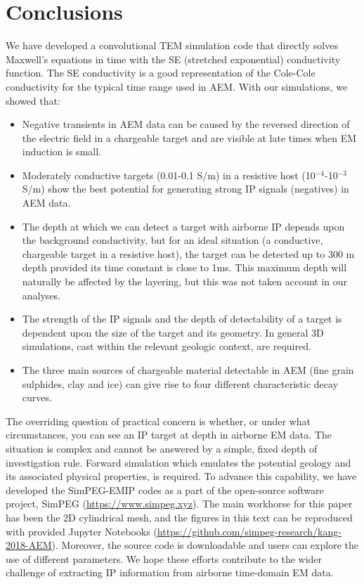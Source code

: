 \documentclass[manuscript]{geophysics}
\begin{document}
\section{Conclusions}
We have developed a convolutional TEM simulation code that directly solves Maxwell's equations in time with the SE (stretched exponential) conductivity function. The SE conductivity is a good representation of the Cole-Cole conductivity for the typical time range used in AEM. With our simulations, we showed that:
\begin{itemize}
    \item Negative transients in AEM data can be caused by the reversed direction of the electric field in a chargeable target and are visible at late times when EM induction is small.
    \item Moderately conductive targets (0.01-0.1 S/m) in a resistive host (10$^{-4}$-10$^{-3}$ S/m) show the best potential for generating strong IP signals (negatives) in AEM data.
    \item The depth at which we can detect a target with airborne IP depends upon the background conductivity, but for an ideal situation (a conductive, chargeable target in a resistive host), the target can be detected up to 300 m depth provided its time constant is close to 1ms. This maximum depth will naturally be affected by the layering, but this was not taken account in our analyses.
    \item The strength of the IP signals and the depth of detectability of a target is dependent upon the size of the target and its geometry. In general 3D simulations, cast within the relevant geologic context, are required.
    \item The three main sources of chargeable material detectable in AEM (fine grain sulphides, clay and ice) can give rise to four different characteristic decay curves.
\end{itemize}

The overriding question of practical concern is whether, or under what circumstances, you can see an IP target at depth in airborne EM data. The situation is complex and cannot be answered by a simple, fixed depth of investigation rule. Forward simulation which emulates the potential geology and its associated physical properties, is required. To advance this capability, we have developed the SimPEG-EMIP codes as a part of the open-source software project, SimPEG (\url{https://www.simpeg.xyz}). The main workhorse for this paper has been the 2D cylindrical mesh, and the figures in this text can be reproduced with provided Jupyter Notebooks (\url{https://github.com/simpeg-research/kang-2018-AEM}). Moreover, the source code is downloadable and users can explore the use of different parameters. We hope these efforts contribute to the wider challenge of extracting IP information from airborne time-domain EM data.
\end{document}
